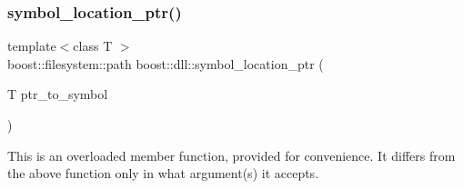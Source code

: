 \subsubsection{\texorpdfstring{symbol\+\_\+location\+\_\+ptr()}{symbol\_location\_ptr()}\hspace{0.1cm}{\footnotesize\ttfamily [2/2]}}
{\footnotesize\ttfamily template$<$class T $>$ \\
boost\+::filesystem\+::path boost\+::dll\+::symbol\+\_\+location\+\_\+ptr (\begin{DoxyParamCaption}\item[{T}]{ptr\+\_\+to\+\_\+symbol }\end{DoxyParamCaption})\hspace{0.3cm}{\ttfamily [inline]}}

This is an overloaded member function, provided for convenience. It differs from the above function only in what argument(s) it accepts. 